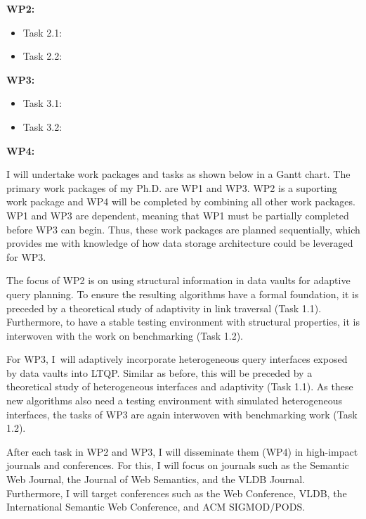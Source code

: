 \documentclass[a4paper,11pt]{article}
\begin{document}
\begin{refsection}
\begin{adjustwidth}{0cm}{0cm}
	\textbf{WP2:      \WPb  {}}
	\begin{itemize}
	  \item Task 2.1: \WPba {}
	  \item Task 2.2: \WPbb {}
	\end{itemize}
	\smallskip
	
	\textbf{WP3:      \WPc  {}}
	\begin{itemize}
	  \item Task 3.1: \WPca {}
	  \item Task 3.2: \WPcb {}
	\end{itemize}
	\smallskip
	
	\textbf{WP4:      \WPd  {}}
\end{adjustwidth}

\noindent
I will undertake work packages and tasks as shown below in a Gantt chart.
The primary work packages of my Ph.D. are WP1 and WP3.
WP2 is a suporting work package and WP4 will be completed by combining all other work packages.
WP1 and WP3 are dependent, meaning that WP1 must be partially completed before WP3 can begin.
Thus, these work packages are planned sequentially, which provides me with knowledge of how data storage architecture could be leveraged for WP3.


The focus of WP2 is on using structural information in data vaults for adaptive query planning.
To ensure the resulting algorithms have a formal foundation,
it is preceded by a theoretical study of adaptivity in link traversal (Task 1.1).
Furthermore, to have a stable testing environment with structural properties,
it is interwoven with the work on benchmarking (Task 1.2).

For WP3, I~will adaptively incorporate heterogeneous query interfaces exposed by data vaults into LTQP.
Similar as before, this will be preceded by a theoretical study of heterogeneous interfaces and adaptivity (Task 1.1).
As these new algorithms also need a testing environment with simulated heterogeneous interfaces,
the tasks of WP3 are again interwoven with benchmarking work (Task 1.2).

After each task in WP2 and WP3, I will disseminate them (WP4) in high-impact journals and conferences.
For this, I will focus on journals such as the Semantic Web Journal, the Journal of Web Semantics, and the VLDB Journal.
Furthermore, I will target conferences such as the Web Conference, VLDB,
the International Semantic Web Conference, and ACM SIGMOD/PODS.


\end{refsection}
\end{document}
